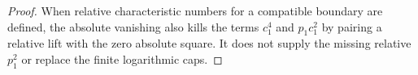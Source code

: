 \begin{proof}
When relative characteristic numbers for a compatible boundary
are defined, the absolute vanishing also kills the terms
$c_1^4$ and $p_1c_1^2$ by pairing a relative lift with the zero
absolute square.  It does not supply the missing relative
$p_1^2$ or replace the finite logarithmic caps.
\end{proof}
